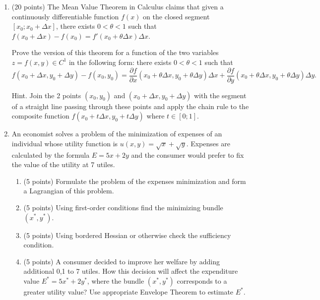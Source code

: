 \documentclass[12pt]{article} %
\theoremstyle{definition} %
\def \putyourname{\fbox{
    \begin{minipage}{42em}
      Name, group no:\vspace*{3ex}\par
      \noindent\dotfill\vspace{2mm}
    \end{minipage}
  }
}
\begin{document}
  \newpage
  \putyourname  
  \begin{enumerate}[resume]
  
    \item (20 points) The Mean Value Theorem in Calculus claims that given a continuously differentiable function $f(x)$  
    on the closed segment $[x_0; x_0 + \Delta x]$, there exists $0 < \theta < 1$ such that $f(x_0 + \Delta x) - f(x_0) = 
    f'(x_0 + \theta \Delta x) \Delta x$. 
  
    Prove the version of this theorem for a function of the two variables $z = f(x,y) \in C^1$ in the following form: 
    there exists $0 < \theta < 1$ such that 
    \[
      f(x_0 + \Delta x, y_0 + \Delta y) - f(x_0, y_0) = \frac{\partial f}{\partial x}(x_0 + \theta \Delta x, y_0 + \theta \Delta y)\Delta x + \frac{\partial f}{\partial y}(x_0 + \theta \Delta x, y_0 + \theta \Delta y)\Delta y.  
    \]
    
    
    Hint. Join the 2 points $(x_0, y_0)$ and $(x_0 + \Delta x, y_0 + \Delta y)$ with the segment of a straight line passing through these points 
    and apply the chain rule to the composite function $f(x_0 + t \Delta x, y_0 + t \Delta y)$ where $t\in [0;1]$.
    
    
    \newpage
\putyourname
\item An economist solves a problem of the minimization of expenses of an individual whose utility function is $u(x, y) = \sqrt{x} + \sqrt{y}$. 
    Expenses are calculated by the formula $E=5x + 2y$ and the consumer would prefer to fix the value of the utility at 7 utiles.
    \begin{enumerate}
    \item (5 points) Formulate the problem of the expenses minimization and form a Lagrangian of this problem.
    \item (5 points) Using first-order conditions find the minimizing bundle $(x^*, y^*)$.
    \item (5 points) Using bordered Hessian or otherwise check the sufficiency condition.
    \item (5 points) A consumer decided to improve her welfare by adding additional 0,1 to 7 utiles. 
    How this decision will affect the expenditure value $E^* = 5x^* + 2y^*$, 
    where the bundle $(x^*, y^*)$ corresponds to a greater utility value? 
    Use appropriate Envelope Theorem to estimate $E^*$.
  \end{enumerate}
  
  \end{enumerate}
  
  
\end{document}
